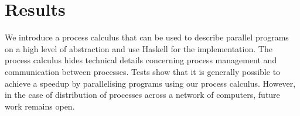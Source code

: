 \section{Results}
We introduce a process calculus that can be used to describe parallel programs on a high level of abstraction and use \textsf{Haskell} for the implementation. The process calculus hides technical details concerning process management and communication between processes. Tests show that it is generally possible to achieve a speedup by parallelising programs using our process calculus. However, in the case of distribution of processes across a network of computers, future work remains open.